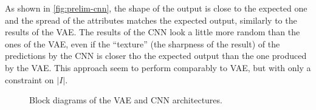 As shown in \cref{fig:prelim-cnn}, the shape of the output is close to the expected one and the spread of the attributes matches the expected output, similarly to the results of the VAE.
The results of the CNN look a little more random than the ones of the VAE, even if the ``texture'' (the sharpness of the result) of the predictions by the CNN is closer tho the expected output than the one produced by the VAE.
This approach seem to perform comparably to VAE, but with only a constraint on $|I|$.

\begin{figure}
    \centering
    \caption{Block diagrams of the VAE and CNN architectures.}
\end{figure}

